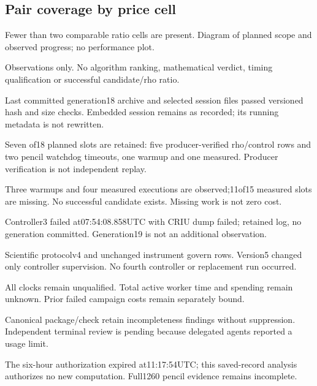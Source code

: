 \documentclass[10pt]{article}
\begin{document}
\subsection*{Pair coverage by price cell}
\par
Fewer than two comparable ratio cells are present. Diagram of planned scope and observed progress; no performance plot.\par
Observations only. No algorithm ranking, mathematical verdict, timing qualification or successful candidate/rho ratio.\par
Last committed generation18 archive and selected session files passed versioned hash and size checks. Embedded session remains as recorded; its running metadata is not rewritten.\par
Seven of18 planned slots are retained: five producer-verified rho/control rows and two pencil watchdog timeouts, one warmup and one measured. Producer verification is not independent replay.\par
Three warmups and four measured executions are observed;11of15 measured slots are missing. No successful candidate exists. Missing work is not zero cost.\par
Controller3 failed at07:54:08.858UTC with CRIU dump failed; retained log, no generation committed. Generation19 is not an additional observation.\par
Scientific protocolv4 and unchanged instrument govern rows. Version5 changed only controller supervision. No fourth controller or replacement run occurred.\par
All clocks remain unqualified. Total active worker time and spending remain unknown. Prior failed campaign costs remain separately bound.\par
Canonical package/check retain incompleteness findings without suppression. Independent terminal review is pending because delegated agents reported a usage limit.\par
The six-hour authorization expired at11:17:54UTC; this saved-record analysis authorizes no new computation. Full1260 pencil evidence remains incomplete.\par
\end{document}
